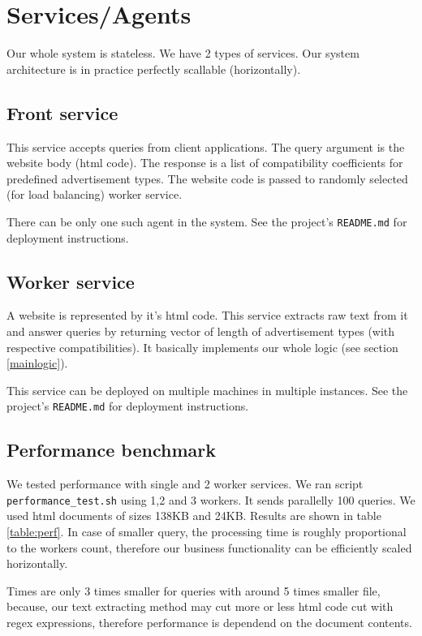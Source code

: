 \documentclass[a4paper]{article}
\begin{document}
\section{Services/Agents}
Our whole system is stateless.
We have 2 types of services.
Our system architecture is in practice perfectly scallable (horizontally).

\subsection{Front service}

This service accepts queries from client applications.
The query argument is the website body (html code).
The response is a list of compatibility coefficients for predefined advertisement types.
The website code is passed to randomly selected (for load balancing) worker service.

There can be only one such agent in the system.
See the project's \texttt{README.md} for deployment instructions.


\subsection{Worker service}
A website is represented by it's html code.
This service extracts raw text from it and answer queries by returning vector of length of advertisement types
(with respective compatibilities).
It basically implements our whole logic (see section \ref{mainlogic}).

This service can be deployed on multiple machines in multiple instances.
See the project's \texttt{README.md} for deployment instructions.

\subsection {Performance benchmark}
\label{perf}

We tested performance with single and 2 worker services.
We ran script \texttt{performance\_test.sh} using 1,2 and 3 workers.
It sends parallelly 100 queries.
We used html documents of sizes 138KB and 24KB.
Results are shown in table \ref{table:perf}.
In case of smaller query, the processing time is roughly proportional to the workers count,
therefore our business functionality can be efficiently scaled horizontally.

Times are only 3 times smaller for queries with around 5 times smaller file,
because, our text extracting method may cut
more or less html code cut with regex expressions,
therefore performance is dependend on the document contents.
\end{document}
